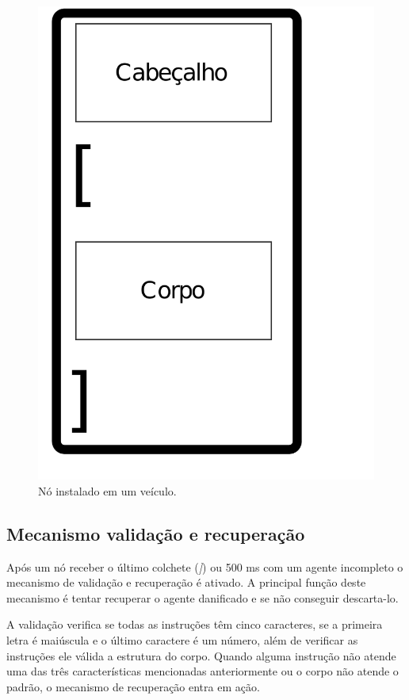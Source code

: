 \begin{figure}[htbp]
	\centering
	\includegraphics[scale=0.25]{metodologia/figuras/estruturaAgente.pdf}
	\caption{Nó instalado em um veículo.}
	\label{fig:estruturaAgente}
\end{figure}

\subsection{Mecanismo validação e recuperação}

Após um nó receber o último colchete (\emph{]}) ou 500 ms com um agente incompleto o mecanismo de validação e recuperação é ativado. A principal função deste mecanismo é tentar recuperar o agente danificado e se não conseguir descarta-lo. 

A validação verifica se todas as instruções têm cinco caracteres, se a primeira letra é maiúscula e o último caractere é um número, além de verificar as instruções ele válida a estrutura do corpo. Quando alguma instrução não atende uma das três características mencionadas anteriormente ou o corpo não atende o padrão, o mecanismo de recuperação entra em ação. 

